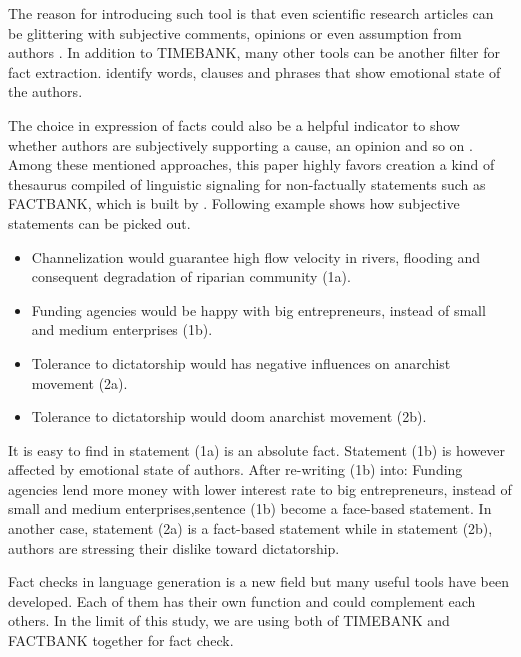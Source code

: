 The reason for introducing such tool is that even scientific research articles can be glittering with subjective comments, opinions or even assumption from authors \cite{schultze2000confessional}. In addition to TIMEBANK, many other tools can be another filter for fact extraction. \cite{Dave2003mining} identify words, clauses and phrases that show emotional state of the authors. 

The choice in expression of facts could also be a helpful indicator to show whether authors are subjectively supporting a cause, an opinion and so on \cite{Wiebe2005}. Among these mentioned approaches, this paper highly favors creation a kind of thesaurus compiled of linguistic signaling for non-factually statements such as FACTBANK, which is built by \cite{Sauri2009}. 
Following example shows how subjective statements can be picked out.

\begin{itemize}
	\item Channelization would guarantee high flow velocity in rivers, flooding and consequent degradation of riparian community (1a).
	\item Funding agencies would be happy with big entrepreneurs, instead of small and medium enterprises (1b).
	\item Tolerance to dictatorship would has negative influences on anarchist movement (2a).
	\item Tolerance to dictatorship would doom anarchist movement (2b).
\end{itemize}

It is easy to find in statement (1a) is an absolute fact. 
Statement (1b) is however affected by emotional state of authors. 
After re-writing (1b) into: Funding agencies lend more money with lower interest rate to big entrepreneurs, instead of small 
and medium enterprises,sentence (1b) become a face-based statement. 
In another case, statement (2a) is a fact-based statement while in statement (2b), authors are stressing their dislike toward dictatorship.

Fact checks in language generation is a new field but many useful tools have been developed. Each of them has their own function and could complement each others. In the limit of this study, we are using both of TIMEBANK and FACTBANK together for fact check.


